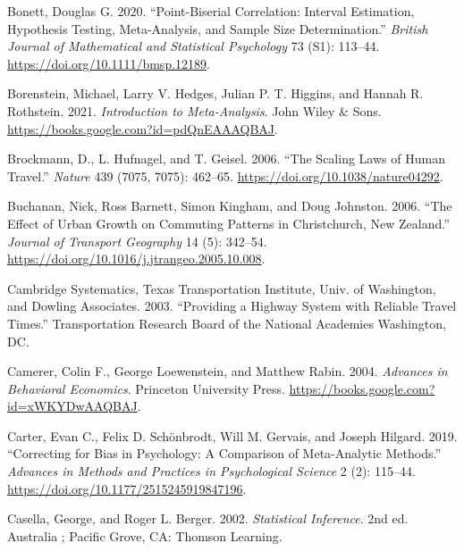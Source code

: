\documentclass[
  11pt,
  openany]{memoir}
\newlength{\cslhangindent}
\newlength{\cslentryspacingunit} %
\newenvironment{CSLReferences}[2] %
 {%
  \setlength{\parindent}{0pt}
  \ifodd #1
  \let\oldpar\par
  \def\par{\hangindent=\cslhangindent\oldpar}
  \fi
  \setlength{\parskip}{#2\cslentryspacingunit}
 }%
 {}
\begin{document}
\begin{CSLReferences}{1}{0}
\leavevmode{}%
Bonett, Douglas G. 2020. {``Point-Biserial Correlation: Interval Estimation, Hypothesis Testing, Meta-Analysis, and Sample Size Determination.''} \emph{British Journal of Mathematical and Statistical Psychology} 73 (S1): 113--44. \url{https://doi.org/10.1111/bmsp.12189}.

\leavevmode{}%
Borenstein, Michael, Larry V. Hedges, Julian P. T. Higgins, and Hannah R. Rothstein. 2021. \emph{Introduction to {Meta}-{Analysis}}. {John Wiley \& Sons}. \url{https://books.google.com?id=pdQnEAAAQBAJ}.

\leavevmode{}%
Brockmann, D., L. Hufnagel, and T. Geisel. 2006. {``The Scaling Laws of Human Travel.''} \emph{Nature} 439 (7075, 7075): 462--65. \url{https://doi.org/10.1038/nature04292}.

\leavevmode{}%
Buchanan, Nick, Ross Barnett, Simon Kingham, and Doug Johnston. 2006. {``The Effect of Urban Growth on Commuting Patterns in {Christchurch}, {New Zealand}.''} \emph{Journal of Transport Geography} 14 (5): 342--54. \url{https://doi.org/10.1016/j.jtrangeo.2005.10.008}.

\leavevmode{}%
Cambridge Systematics, Texas Transportation Institute, Univ. of Washington, and Dowling Associates. 2003. {``Providing a Highway System with Reliable Travel Times.''} Transportation Research Board of the National Academies Washington, DC.

\leavevmode{}%
Camerer, Colin F., George Loewenstein, and Matthew Rabin. 2004. \emph{Advances in {Behavioral Economics}}. {Princeton University Press}. \url{https://books.google.com?id=xWKYDwAAQBAJ}.

\leavevmode{}%
Carter, Evan C., Felix D. Schönbrodt, Will M. Gervais, and Joseph Hilgard. 2019. {``Correcting for {Bias} in {Psychology}: A {Comparison} of {Meta}-{Analytic Methods}.''} \emph{Advances in Methods and Practices in Psychological Science} 2 (2): 115--44. \url{https://doi.org/10.1177/2515245919847196}.

\leavevmode{}%
Casella, George, and Roger L. Berger. 2002. \emph{Statistical Inference}. 2nd ed. {Australia ; Pacific Grove, CA}: {Thomson Learning}.


\end{CSLReferences}
\end{document}
